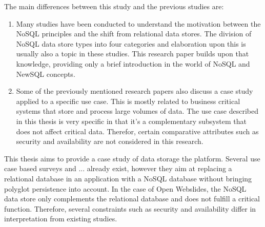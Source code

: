 
The main differences between this study and the previous studies are:

\begin{enumerate}
  \item Many studies have been conducted to understand the motivation between the NoSQL principles and the shift from relational data stores. The division of NoSQL data store types into four categories and elaboration upon this is usually also a topic in these studies. This research paper builds upon that knowledge, providing only a brief introduction in the world of NoSQL and NewSQL concepts.
  \item Some of the previously mentioned research papers also discuss a case study applied to a specific use case. This is mostly related to business critical systems that store and process large volumes of data. The use case described in this thesis is very specific in that it's a complementary subsystem that does not affect critical data. Therefor, certain comparative attributes such as security and availability are not considered in this research.
\end{enumerate}


This thesis aims to provide a case study of data storage the \textcite{OpenWebslides2017} platform. Several use case based surveys and ... already exist, however they aim at replacing a relational database in an application with a NoSQL database without bringing polyglot persistence into account. In the case of Open Webslides, the NoSQL data store only complements the relational database and does not fulfill a critical function. Therefore, several constraints such as security and availability differ in interpretation from existing studies.
